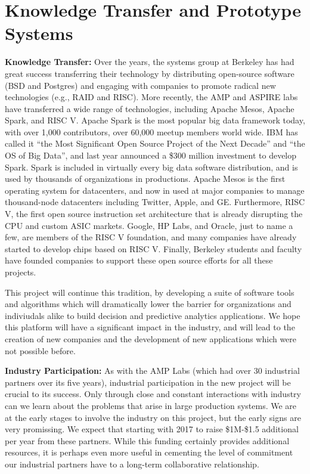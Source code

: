 \section{Knowledge Transfer and Prototype Systems}

{\bf Knowledge Transfer:} Over the years, the systems group at Berkeley has had great success transferring their technology by distributing open-source software (\eg BSD and Postgres) and engaging with companies to promote radical new technologies (e.g., RAID and RISC).  More recently, the AMP and ASPIRE labs have transferred a wide range of technologies, including Apache Mesos, Apache Spark, and RISC V. Apache Spark is the most popular big data framework today, with over 1,000 contributors, over 60,000 meetup members world wide. IBM has called it ``the Most Significant Open Source Project of the Next Decade'' and ``the OS of Big Data'', and last year announced a \$300 million investment to develop Spark. Spark is included in virtually every big data software distribution, and is used by thousands of organizations in productions. Apache Mesos is the first operating system for datacenters, and now in used at major companies to manage thousand-node datacenters including Twitter, Apple, and GE.  Furthermore, RISC V, the first open source instruction set architecture that is already disrupting the CPU and custom ASIC markets. Google, HP Labs, and Oracle, just to name a few, are members of the RISC V foundation, and many companies have already started to develop chips based on RISC V. Finally, Berkeley students and faculty have founded companies to support these open source efforts for all these projects.

This project will continue this tradition, by developing a suite of software tools and algorithms which will dramatically lower the barrier for organizations and indiviudals alike to build decision and predictive analytics applications. We hope this platform will have a significant impact in the industry, and will lead to the creation of new companies and the development of new applications which were not possible before.


{\bf Industry Participation:} As with the AMP  Labs (which had over 30 industrial partners over its five years), industrial participation in the new project will be crucial to its success.  Only through close and constant interactions with industry can we learn about the problems that arise in large production systems.  We are at the early stages to involve the industry on this project, but the early signs are very promissing. We expect that starting with 2017 to raise \$1M-\$1.5 additional per year from these partners. While this funding certainly provides additional resources, it is perhaps even more useful in cementing the level of commitment our industrial partners have to a long-term collaborative relationship.

